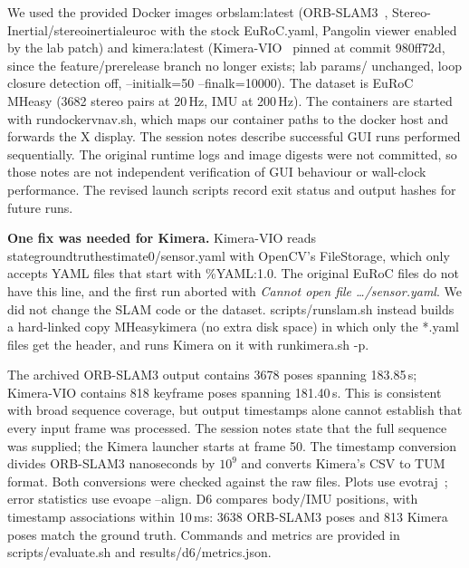 \documentclass[11pt,a4paper]{article}
\DeclareRobustCommand{\code}[1]{\begingroup\ttfamily\codebreaks#1\endgroup}
\newcommand{\codebreaks}{\renewcommand{\_}{\textunderscore\allowbreak}}
\begin{document}
We used the provided Docker images \code{orbslam:latest} (ORB-SLAM3~\cite{campos2021orbslam3},
\code{Stereo-Inertial/\allowbreak stereo\_inertial\_euroc} with the stock \code{EuRoC.yaml}, Pangolin viewer
enabled by the lab patch) and \code{kimera:latest} (Kimera-VIO~\cite{rosinol2020kimera} pinned at
commit \code{980ff72d}, since the \code{feature/prerelease} branch no longer exists; lab
\code{params/} unchanged, loop closure detection off, \code{--initial\_k=50 --final\_k=10000}).
The dataset is EuRoC~\cite{burri2016euroc} \code{MH\_01\_easy} (3682 stereo pairs at 20\,Hz, IMU at
200\,Hz). The containers are started with \code{run\_docker\_vnav.sh}, which maps our container
paths to the docker host and forwards the X display. The session notes describe successful GUI runs performed sequentially. The original
runtime logs and image digests were not committed, so those notes are not independent
verification of GUI behaviour or wall-clock performance. The revised launch scripts
record exit status and output hashes for future runs.

\textbf{One fix was needed for Kimera.} Kimera-VIO reads
\code{state\_groundtruth\_estimate0/\allowbreak sensor.yaml} with OpenCV's \code{FileStorage}, which only
accepts YAML files that start with \code{\%YAML:1.0}. The original EuRoC files do not have this
line, and the first run aborted with \emph{Cannot open file \dots/sensor.yaml}. We did not change
the SLAM code or the dataset. \code{scripts/run\_slam.sh} instead builds a hard-linked copy
\code{MH\_01\_easy\_kimera} (no extra disk space) in which only the \code{*.yaml} files get the
header, and runs Kimera on it with \code{run\_kimera.sh -p}.

The archived ORB-SLAM3 output contains 3678 poses spanning 183.85\,s; Kimera-VIO
contains 818 keyframe poses spanning 181.40\,s. This is consistent with broad sequence
coverage, but output timestamps alone cannot establish that every input frame was processed.
The session notes state that the full sequence was supplied; the Kimera launcher starts
at frame 50. The timestamp conversion divides ORB-SLAM3 nanoseconds by $10^9$ and converts
Kimera's CSV to TUM format. Both conversions were checked against the raw files.
Plots use \code{evo\_traj}~\cite{grupp2017evo}; error statistics use \code{evo\_ape --align}.
D6 compares body/IMU positions, with timestamp associations within 10\,ms: 3638 ORB-SLAM3
poses and 813 Kimera poses match the ground truth. Commands and metrics are provided in
\code{scripts/evaluate.sh} and \code{results/d6/metrics.json}.
\end{document}
